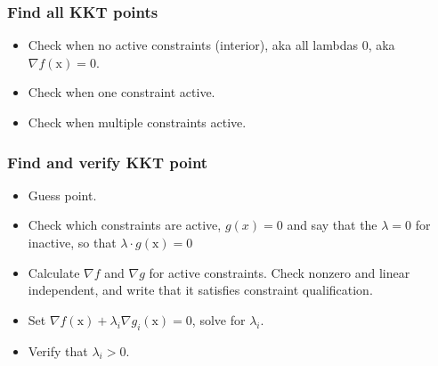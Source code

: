 \documentclass[6pt]{article}
\def\x{\textrm{x}}
\begin{document}
\subsubsection*{Find all KKT points}
\begin{itemize}
    \item Check when no active constraints (interior), aka all lambdas 0, aka $\nabla f(\x)=0$.
    \item Check when one constraint active.
    \item Check when multiple constraints active.
\end{itemize}{}
\subsubsection*{Find and verify KKT point}
\begin{itemize}
    \item Guess point.
    \item Check which constraints are active, $g(x)=0$ and say that the  $\lambda=0$ for inactive, so that $\lambda \cdot g(\x)=0$
    \item Calculate $\nabla f$ and $\nabla g$ for active constraints. Check nonzero and linear independent, and write that it satisfies constraint qualification.
    \item Set $\nabla f(\x) + \lambda_i \nabla g_i(\x)=0$, solve for $\lambda_i$.
    \item Verify that $\lambda_i > 0$.
\end{itemize}{}
\end{document}
